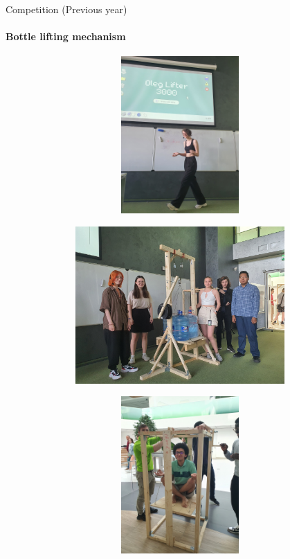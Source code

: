 \documentclass[aspectratio=169]{beamer}
\begin{document}
\begin{frame}[t]{Competition (Previous year)}
\framesubtitle{Bottle lifting mechanism}
    \begin{figure}[H]
        \begin{subfigure}{0.24\textwidth}
            \centering\includegraphics[height=6cm,width=1\textwidth,keepaspectratio]{2023-07-13 12-25-17.JPG}
        \end{subfigure}
        \begin{subfigure}{0.45\textwidth}
            \centering\includegraphics[height=6cm,width=1\textwidth,keepaspectratio]{2023-07-13 12-55-15.JPG}
        \end{subfigure}
        \begin{subfigure}{0.24\textwidth}
            \centering\includegraphics[height=6cm,width=1\textwidth,keepaspectratio]{2023-07-13 13-25-20.JPG}
        \end{subfigure}
    \end{figure}
\end{frame}
\end{document}
